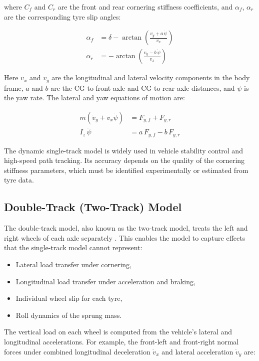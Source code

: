 \documentclass[a4paper,12pt]{report}
\begin{document}
where $C_f$ and $C_r$ are the front and rear cornering stiffness coefficients,
and $\alpha_f$, $\alpha_r$ are the corresponding tyre slip angles:

\begin{align}
\alpha_f &= \delta - \arctan\!\left(\frac{v_y + a\,\dot{\psi}}{v_x}\right) \\
\alpha_r &=        - \arctan\!\left(\frac{v_y - b\,\dot{\psi}}{v_x}\right)
\end{align}

Here $v_x$ and $v_y$ are the longitudinal and lateral velocity components in
the body frame, $a$ and $b$ are the CG-to-front-axle and CG-to-rear-axle
distances, and $\dot{\psi}$ is the yaw rate. The lateral and yaw equations of
motion are:

\begin{align}
m\!\left(\dot{v}_y + v_x\dot{\psi}\right) &= F_{y,f} + F_{y,r} \\
I_z\,\ddot{\psi}                          &= a\,F_{y,f} - b\,F_{y,r}
\end{align}

The dynamic single-track model is widely used in vehicle stability control and
high-speed path tracking. Its accuracy depends on the quality of the cornering
stiffness parameters, which must be identified experimentally or estimated from
tyre data.

\subsection{Double-Track (Two-Track) Model}

The double-track model, also known as the two-track model, treats the left and
right wheels of each axle separately \cite{schramm2014}. This enables the model
to capture effects that the single-track model cannot represent:

\begin{itemize}
  \item Lateral load transfer under cornering,
  \item Longitudinal load transfer under acceleration and braking,
  \item Individual wheel slip for each tyre,
  \item Roll dynamics of the sprung mass.
\end{itemize}

The vertical load on each wheel is computed from the vehicle's lateral and
longitudinal accelerations. For example, the front-left and front-right normal
forces under combined longitudinal deceleration $\dot{v}_x$ and lateral
acceleration $\dot{v}_y$ are:
\end{document}

